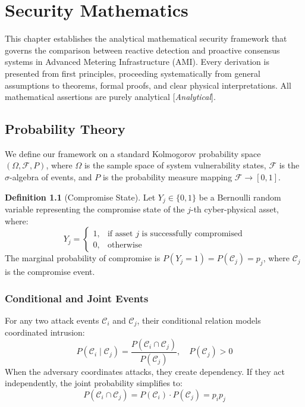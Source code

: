 \documentclass[12pt, oneside, a4paper]{report}
\theoremstyle{definition}
\newtheorem{definition}[theorem]{Definition}
\theoremstyle{remark}
\newcommand{\analytical}{[\textit{Analytical}]}
\begin{document}
\chapter{Security Mathematics}
\label{ch:security_mathematics}

This chapter establishes the analytical mathematical security framework that governs the comparison between reactive detection and proactive consensus systems in Advanced Metering Infrastructure (AMI). Every derivation is presented from first principles, proceeding systematically from general assumptions to theorems, formal proofs, and clear physical interpretations. All mathematical assertions are purely analytical \analytical.

\section{Probability Theory}
\label{sec:sm:probability}

We define our framework on a standard Kolmogorov probability space $(\Omega, \mathcal{F}, P)$, where $\Omega$ is the sample space of system vulnerability states, $\mathcal{F}$ is the $\sigma$-algebra of events, and $P$ is the probability measure mapping $\mathcal{F} \to [0, 1]$.

\begin{definition}[Compromise State]
Let $Y_j \in \{0, 1\}$ be a Bernoulli random variable representing the compromise state of the $j$-th cyber-physical asset, where:
\begin{equation}
Y_j = \begin{cases}
1, & \text{if asset } j \text{ is successfully compromised} \\
0, & \text{otherwise}
\end{cases}
\end{equation}
The marginal probability of compromise is $P(Y_j = 1) = P(\mathcal{C}_j) = p_j$, where $\mathcal{C}_j$ is the compromise event.
\end{definition}

\subsection{Conditional and Joint Events}
For any two attack events $\mathcal{C}_i$ and $\mathcal{C}_j$, their conditional relation models coordinated intrusion:
\begin{equation}
P(\mathcal{C}_i \mid \mathcal{C}_j) = \frac{P(\mathcal{C}_i \cap \mathcal{C}_j)}{P(\mathcal{C}_j)}, \quad P(\mathcal{C}_j) > 0
\end{equation}
When the adversary coordinates attacks, they create dependency. If they act independently, the joint probability simplifies to:
\begin{equation}
P(\mathcal{C}_i \cap \mathcal{C}_j) = P(\mathcal{C}_i) \cdot P(\mathcal{C}_j) = p_i p_j
\end{equation}
\end{document}

